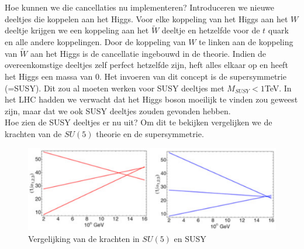 \documentclass[../main.tex]{subfiles}
\begin{document}
Hoe kunnen we die cancellaties nu implementeren? Introduceren we nieuwe deeltjes die koppelen aan het Higgs. Voor elke koppeling van het Higgs aan het $W$ deeltje krijgen we een koppeling aan het $\tilde{W}$ deeltje en hetzelfde voor de $t$ quark en alle andere koppelingen. Door de koppeling van $W$ te linken aan de koppeling van $\tilde{W}$ aan het Higgs is de cancellatie ingebouwd in de theorie. Indien de overeenkomstige deeltjes zelf perfect hetzelfde zijn, heft alles elkaar op en heeft het Higgs een massa van 0. Het invoeren van dit concept is de supersymmetrie (=SUSY). Dit zou al moeten werken voor SUSY deeltjes met $M_{SUSY}<1$TeV. In het LHC hadden we verwacht dat het Higgs boson moeilijk te vinden zou geweest zijn, maar dat we ook SUSY deeltjes zouden gevonden hebben.\\
Hoe zien de SUSY deeltjes er nu uit? Om dit te bekijken vergelijken we de krachten van de $SU(5)$ theorie en de supersymmetrie.

\begin{figure}[h]
    \centering
    \includegraphics[width=0.5\linewidth]{physics_beyond_the_standard_model/su5_vs_susy.png}
    \caption{Vergelijking van de krachten in $SU(5)$ en SUSY}%
    \label{fig:physics_beyond_the_standard_model/su5_vs_susy}
\end{figure}
\end{document}
